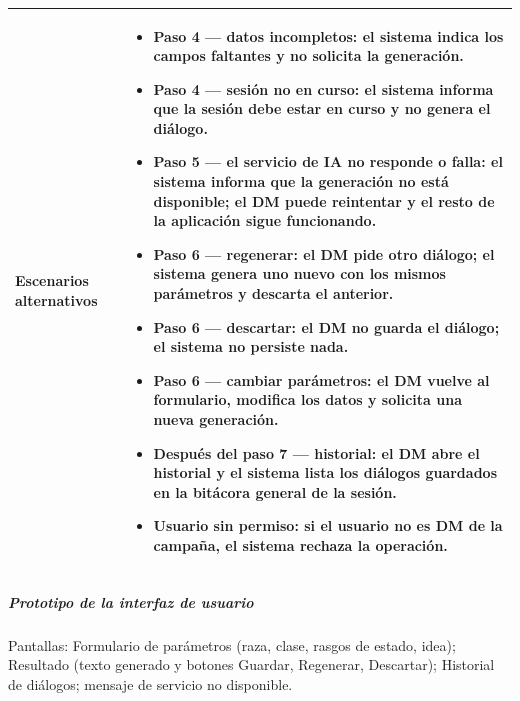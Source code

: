 {\begin{longtable}{|>{\raggedright\arraybackslash\bfseries}p{3.2cm}|>{\raggedright\arraybackslash}p{11.9cm}|}
Escenarios alternativos & \begin{itemize}[itemsep=2pt,topsep=2pt]
\item \textbf{Paso 4 — datos incompletos:} el sistema indica los campos faltantes y no solicita la generación.
\item \textbf{Paso 4 — sesión no en curso:} el sistema informa que la sesión debe estar en curso y no genera el diálogo.
\item \textbf{Paso 5 — el servicio de IA no responde o falla:} el sistema informa que la generación no está disponible; el DM puede reintentar y el resto de la aplicación sigue funcionando.
\item \textbf{Paso 6 — regenerar:} el DM pide otro diálogo; el sistema genera uno nuevo con los mismos parámetros y descarta el anterior.
\item \textbf{Paso 6 — descartar:} el DM no guarda el diálogo; el sistema no persiste nada.
\item \textbf{Paso 6 — cambiar parámetros:} el DM vuelve al formulario, modifica los datos y solicita una nueva generación.
\item \textbf{Después del paso 7 — historial:} el DM abre el historial y el sistema lista los diálogos guardados en la bitácora general de la sesión.
\item \textbf{Usuario sin permiso:} si el usuario no es DM de la campaña, el sistema rechaza la operación.
\end{itemize} \\ \hline
\end{longtable}}
\subparagraph{Prototipo de la interfaz de usuario}
Pantallas: Formulario de parámetros (raza, clase, rasgos de estado, idea); Resultado (texto generado y botones Guardar, Regenerar, Descartar); Historial de diálogos; mensaje de servicio no disponible.

